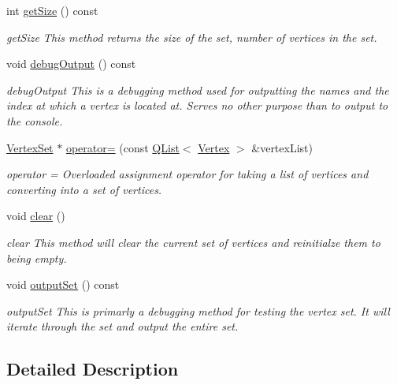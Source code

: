 \begin{DoxyCompactItemize}
int \hyperlink{class_vertex_set_a28d7aa485f4fd9a7e081533d3c38a78b}{get\+Size} () const 
\begin{DoxyCompactList}\small\item\em get\+Size This method returns the size of the set, number of vertices in the set. \end{DoxyCompactList}\item 
void \hyperlink{class_vertex_set_a99b08cc5a61bcf73c5f870d24956a1cc}{debug\+Output} () const 
\begin{DoxyCompactList}\small\item\em debug\+Output This is a debugging method used for outputting the names and the index at which a vertex is located at. Serves no other purpose than to output to the console. \end{DoxyCompactList}\item 
\hyperlink{class_vertex_set}{Vertex\+Set} $\ast$ \hyperlink{class_vertex_set_af89977bcaadf107f636df2521408d952}{operator=} (const \hyperlink{class_q_list}{Q\+List}$<$ \hyperlink{class_vertex}{Vertex} $>$ \&vertex\+List)
\begin{DoxyCompactList}\small\item\em operator = Overloaded assignment operator for taking a list of vertices and converting into a set of vertices. \end{DoxyCompactList}\item 
void \hyperlink{class_vertex_set_a8a5b6eb129c81b4830656588236c4d10}{clear} ()
\begin{DoxyCompactList}\small\item\em clear This method will clear the current set of vertices and reinitialze them to being \textquotesingle{}empty\textquotesingle{}. \end{DoxyCompactList}\item 
void \hyperlink{class_vertex_set_a895011778486f89c67e0bcfdae769079}{output\+Set} () const 
\begin{DoxyCompactList}\small\item\em output\+Set This is primarly a debugging method for testing the vertex set. It will iterate through the set and output the entire set. \end{DoxyCompactList}\end{DoxyCompactItemize}


\subsection{Detailed Description}


